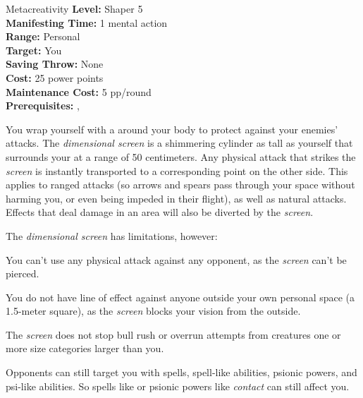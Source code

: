 {Metacreativity}
{
	\textbf{Level:}
	Shaper 5\\
	\textbf{Manifesting Time:}
	1 mental action\\
	\textbf{Range:}
	Personal\\
	\textbf{Target:}
	You\\
	\textbf{Saving Throw:}
	None\\
	\textbf{Cost:}
	25 power points\\
	\textbf{Maintenance Cost:}
	5 pp/round\\
	\textbf{Prerequisites:}
	, \\
}
{
	You wrap yourself with a  around your body to protect against your enemies' attacks. The \emph{dimensional screen} is a shimmering cylinder as tall as yourself that surrounds your at a range of 50 centimeters. Any physical attack that strikes the \emph{screen} is instantly transported to a corresponding point on the other side. This applies to ranged attacks (so arrows and spears pass through your space without harming you, or even being impeded in their flight), as well as natural attacks. Effects that deal damage in an area will also be diverted by the \emph{screen}.

	The \emph{dimensional screen} has limitations, however:
	\begin{itemize*}
		\item You can't use any physical attack against any opponent, as the \emph{screen} can't be pierced.
		\item You do not have line of effect against anyone outside your own personal space (a 1.5-meter square), as the \emph{screen} blocks your vision from the outside.
		\item The \emph{screen} does not stop bull rush or overrun attempts from creatures one or more size categories larger than you.
	\end{itemize*}

	Opponents can still target you with spells, spell-like abilities, psionic powers, and psi-like abilities. So spells like  or psionic powers like \emph{contact} can still affect you.
}